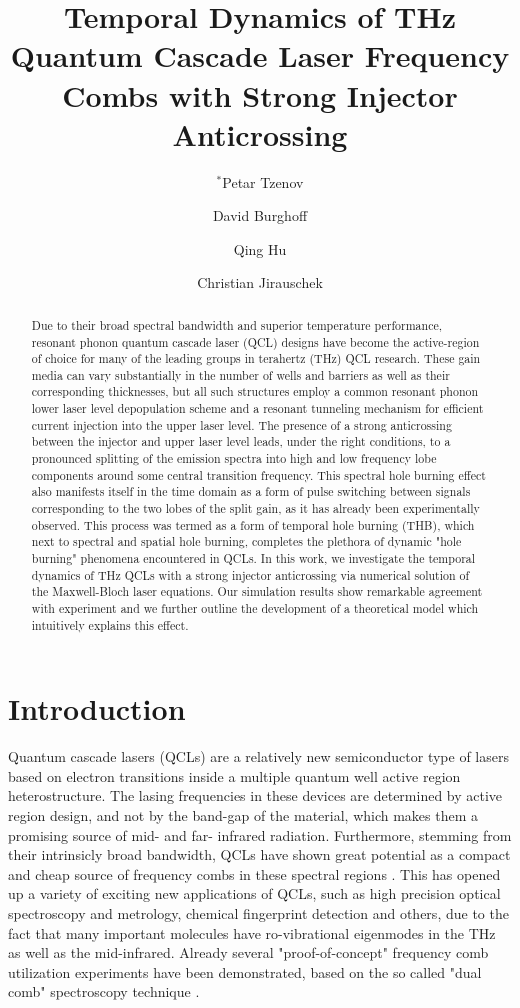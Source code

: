 \documentclass[]{spie}  %
\title{Temporal Dynamics of THz Quantum Cascade Laser
	Frequency Combs with Strong Injector Anticrossing}
\author[a]{$^*$Petar Tzenov}
\author[b]{David Burghoff}
\author[b]{Qing Hu}
\author[a]{Christian Jirauschek}
\affil[a]{Institute for Nanoelectronics, Technical University of Munich,
	D-80333 Munich, Germany}
\affil[b]{Department of Electrical Engineering
	and Computer Science, Research Laboratory of Electronics, Massachusetts
	Institute of Technology, Cambridge, Massachusetts 02139, USA}
\begin{document}
 
\maketitle
\begin{abstract}
 Due to their broad spectral bandwidth and superior temperature performance, resonant phonon quantum cascade laser (QCL) designs have become the active-region of choice for many of the leading groups in terahertz (THz) QCL research. These gain media can vary substantially in the number of wells and barriers as well as their corresponding thicknesses, but all such structures employ a common resonant phonon lower laser level depopulation scheme and a resonant tunneling mechanism for efficient current injection into the upper laser level. The presence of a strong anticrossing between the injector and upper laser level leads, under the right conditions, to a pronounced splitting of the emission spectra into high and low frequency lobe components around some central transition frequency. This spectral hole burning effect also manifests itself in the time domain as a form of pulse switching between signals corresponding to the two lobes of the split gain, as it has  already been experimentally observed. This process was termed as a form of temporal hole burning (THB), which next to spectral and spatial hole burning, completes the plethora of dynamic "hole burning" phenomena encountered in QCLs. In this work, we investigate the temporal dynamics of THz QCLs with a strong injector anticrossing via numerical solution of the Maxwell-Bloch laser equations. Our simulation results show remarkable agreement with experiment and we further outline the development of a theoretical model which intuitively explains this effect.
\end{abstract}



\section{Introduction}

Quantum cascade lasers (QCLs) are a relatively new semiconductor type of lasers based on electron transitions inside a multiple quantum well active region heterostructure. The lasing
frequencies in these devices are determined by active region design, and not by the band-gap of the material, which makes them a promising source of mid- and far- infrared radiation. Furthermore, stemming from their intrinsicly broad bandwidth, QCLs have shown great potential as a compact and cheap source of frequency combs in these spectral regions \cite{burghoff2014terahertz,hugi2012mid,rosch2015octave}. This has opened up a variety of exciting new applications of QCLs, such as high precision optical spectroscopy and metrology, chemical fingerprint detection and others, due to the fact that many important molecules have ro-vibrational eigenmodes in the THz as well as the mid-infrared. Already several "proof-of-concept" frequency comb utilization experiments have been demonstrated, based on the so called "dual comb" spectroscopy technique \cite{villares2014dual,yang2016terahertz}.
\end{document}
